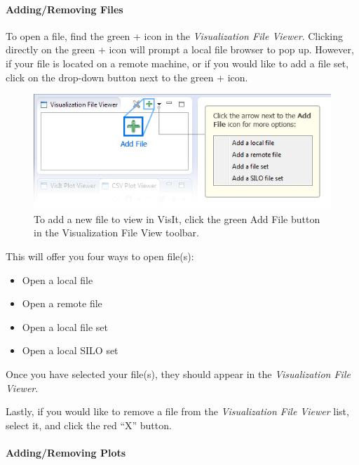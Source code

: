 \paragraph{Adding/Removing Files}\label{addingremoving-files}

To open a file, find the green + icon in the \emph{Visualization File
Viewer}. Clicking directly on the green + icon will prompt a local
file browser to pop up. However, if your file is located on a remote
machine, or if you would like to add a file set, click on the drop-down
button next to the green + icon.

\begin{figure}[htbp]
\centering
\includegraphics[width=\textwidth]{figures/ICE_VisItAddFileButton.png}
\caption{To add a new file to view in VisIt, click the green Add File button in the Visualization File View toolbar.}
\end{figure}

This will offer you four ways to open file(s):

\begin{itemize}
\itemsep1pt\parskip0pt
\item
  Open a local file
\item
  Open a remote file
\item
  Open a local file set
\item
  Open a local SILO set
\end{itemize}

Once you have selected your file(s), they should appear in the
\emph{Visualization File Viewer}.

Lastly, if you would like to remove a file from the \emph{Visualization
File Viewer} list, select it, and click the red ``X'' button.

\paragraph{Adding/Removing Plots}\label{addingremoving-plots}

